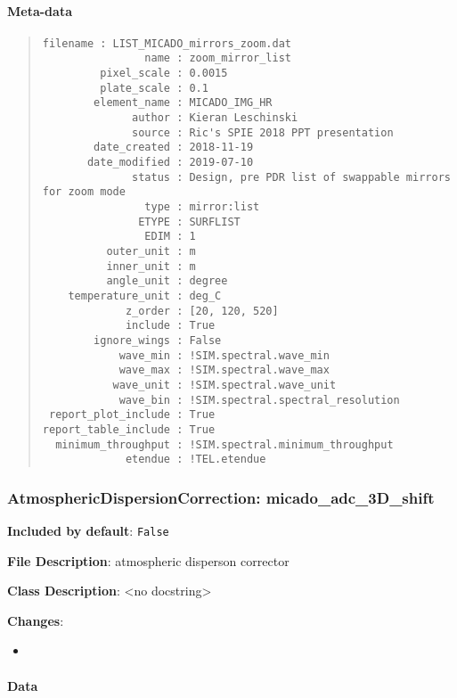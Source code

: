 \paragraph{Meta-data%
  \label{meta-data}%
}

\begin{quote}
\begin{alltt}
\begin{lstlisting}[frame=single]
            filename : LIST_MICADO_mirrors_zoom.dat
                name : zoom_mirror_list
         pixel_scale : 0.0015
         plate_scale : 0.1
        element_name : MICADO_IMG_HR
              author : Kieran Leschinski
              source : Ric's SPIE 2018 PPT presentation
        date_created : 2018-11-19
       date_modified : 2019-07-10
              status : Design, pre PDR list of swappable mirrors for zoom mode
                type : mirror:list
               ETYPE : SURFLIST
                EDIM : 1
          outer_unit : m
          inner_unit : m
          angle_unit : degree
    temperature_unit : deg_C
             z_order : [20, 120, 520]
             include : True
        ignore_wings : False
            wave_min : !SIM.spectral.wave_min
            wave_max : !SIM.spectral.wave_max
           wave_unit : !SIM.spectral.wave_unit
            wave_bin : !SIM.spectral.spectral_resolution
 report_plot_include : True
report_table_include : True
  minimum_throughput : !SIM.spectral.minimum_throughput
             etendue : !TEL.etendue
\end{lstlisting}
\end{alltt}
\end{quote}


\subsubsection{AtmosphericDispersionCorrection: \textquotedbl{}micado\_adc\_3D\_shift\textquotedbl{}%
  \label{atmosphericdispersioncorrection-micado-adc-3d-shift}%
}

\textbf{Included by default}: \texttt{False}

\textbf{File Description}: atmospheric disperson corrector

\textbf{Class Description}: <no docstring>

\textbf{Changes}:

\begin{itemize}
\item \end{itemize}


\paragraph{Data%
  \label{id1}%
}


